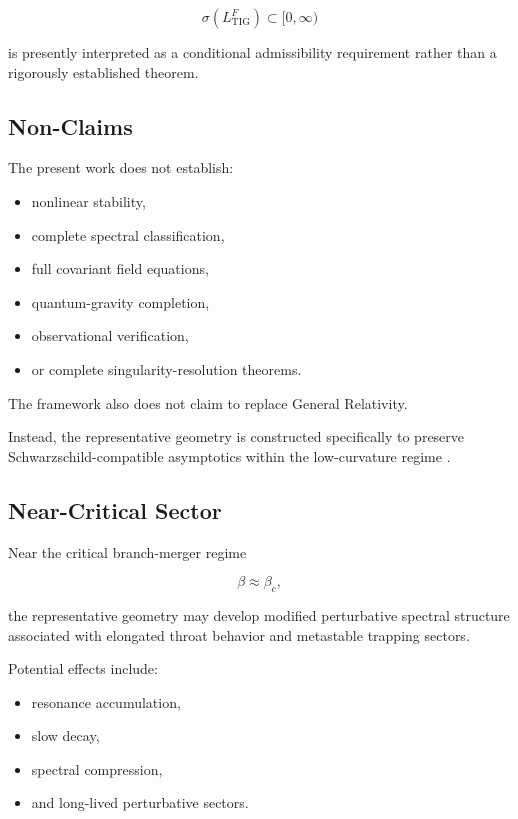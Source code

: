 \begin{equation}
\sigma(L_{\mathrm{TIG}}^{F})
\subset
[0,\infty)
\end{equation}

is presently interpreted as a conditional admissibility requirement rather than a rigorously established theorem.


\subsection{Non-Claims}

The present work does not establish:
\begin{itemize}[leftmargin=0.6cm]
\item nonlinear stability,
\item complete spectral classification,
\item full covariant field equations,
\item quantum-gravity completion,
\item observational verification,
\item or complete singularity-resolution theorems.
\end{itemize}

The framework also does not claim to replace General Relativity.

Instead, the representative geometry is constructed specifically to preserve Schwarzschild-compatible asymptotics within the low-curvature regime \cite{wald1984,hawkingellis1973}.


\subsection{Near-Critical Sector}

Near the critical branch-merger regime

\begin{equation}
\beta \approx \beta_c,
\end{equation}

the representative geometry may develop modified perturbative spectral structure associated with elongated throat behavior and metastable trapping sectors.

Potential effects include:
\begin{itemize}[leftmargin=0.6cm]
\item resonance accumulation,
\item slow decay,
\item spectral compression,
\item and long-lived perturbative sectors.
\end{itemize}


